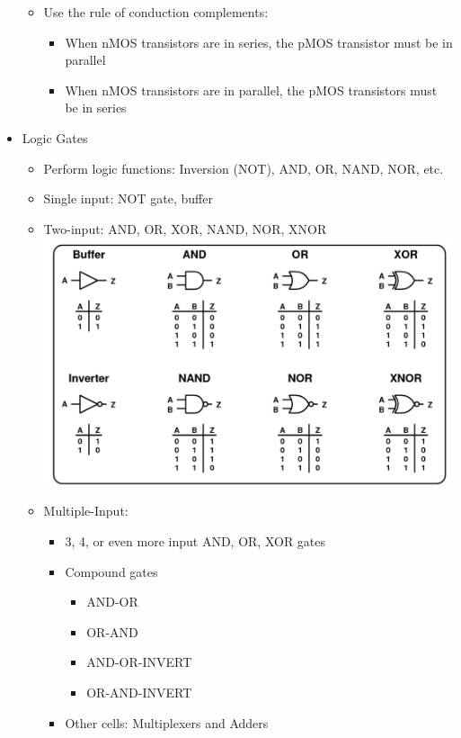 \documentclass[a4paper]{article}
\begin{document}
\begin{itemize}
\begin{itemize}
\item Use the rule of conduction complements:
\begin{itemize}
\item When nMOS transistors are in series, the pMOS transistor must be in parallel
\item When nMOS transistors are in parallel, the pMOS transistors must be in series
\end{itemize}
\end{itemize}
\item Logic Gates
\begin{itemize}
\item Perform logic functions: Inversion (NOT), AND, OR, NAND, NOR, etc.
\item Single input: NOT gate, buffer
\item Two-input: AND, OR, XOR, NAND, NOR, XNOR\\
\includegraphics[scale=0.27]{Figures/commonLogicGates.jpg}
\item Multiple-Input:
\begin{itemize}
\item 3, 4, or even more input AND, OR, XOR gates
\item Compound gates
\begin{itemize}
\item AND-OR
\item OR-AND
\item AND-OR-INVERT
\item OR-AND-INVERT
\end{itemize}
\item Other cells: Multiplexers and Adders
\end{itemize}
\end{itemize}

\end{itemize}
\end{document}
